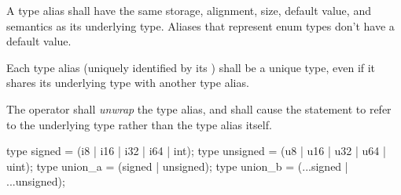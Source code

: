 
\specsubsubitem
A type alias shall have the same storage, alignment, size, default value, and
semantics as its underlying type. Aliases that represent enum types don't have
a default value.

\specsubsubitem
Each type alias (uniquely identified by its ) shall be
a unique type, even if it shares its underlying type with another type alias.

\specsubsubitem
The  operator shall \textit{unwrap} the type alias, and shall
cause the statement to refer to the underlying type rather than the type alias
itself.


\begin{codesample}
type signed = (i8 | i16 | i32 | i64 | int);
type unsigned = (u8 | u16 | u32 | u64 | uint);
type union_a = (signed | unsigned);
type union_b = (...signed | ...unsigned);
\end{codesample}
